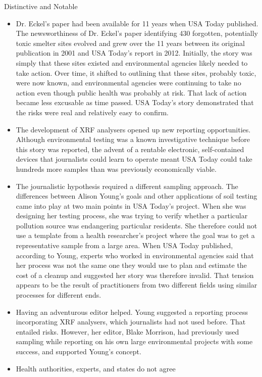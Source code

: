 Distinctive and Notable
\begin{itemize}
\item Dr. Eckel's paper had been available for 11 years when
USA Today published.
The newsworthiness of Dr. Eckel's paper identifying 430 forgotten,
potentially toxic smelter sites evolved and grew over the 11 years
between its original publication in 2001 and USA Today's report in
2012. Initially, the story was simply that these sites existed and environmental
agencies likely needed to take action. Over time, it shifted
to outlining that these sites, probably toxic, were now known, and
environmental agencies were continuing to take no action even
though public health was probably at risk. That lack of action became
less excusable as time passed. USA Today's story demonstrated that
the risks were real and relatively easy to confirm.
\item The development of XRF analysers opened up new
reporting opportunities.
Although environmental testing was a known investigative technique
before this story was reported, the advent of a rentable electronic,
self-contained devices that journalists could learn to operate meant
USA Today could take hundreds more samples than was previously
economically viable.
\item The journalistic hypothesis required a different
sampling approach.
The differences between Alison Young's goals and other applications
of soil testing came into play at two main points in USA Today's project.
When she was designing her testing process, she was trying to
verify whether a particular pollution source was endangering particular
residents. She therefore could not use a template from a health
researcher's project where the goal was to get a representative sample
from a large area. When USA Today published, according to Young,
experts who worked in environmental agencies said that her process
was not the same one they would use to plan and estimate the cost of
a cleanup and suggested her story was therefore invalid. That tension
appears to be the result of practitioners from two different fields using
similar processes for different ends.
\item Having an adventurous editor helped.
Young suggested a reporting process incorporating XRF analysers,
which journalists had not used before. That entailed risks. However,
her editor, Blake Morrison, had previously used sampling while
reporting on his own large environmental projects with some success,
and supported Young's concept.
\item Health authorities, experts, and states do not agree

\end{itemize}
